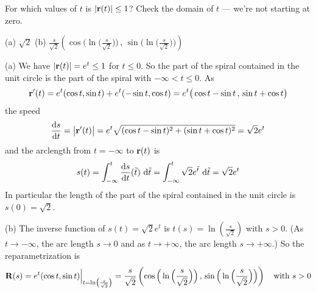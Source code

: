 \begin{hint} 
For which values of $t$ is $|\mathbf{r}(t)|\le 1$? Check the domain of $t$ --- we're not starting at zero.
\end{hint}

\begin{answer} 
(a) $\sqrt{2}$\qquad
(b) $\frac{s}{\sqrt{2}}\left(\cos\Big(\ln\Big(\frac{s}{\sqrt{2}}\Big)\Big)\,,\,
                 \sin\Big(\ln\Big(\frac{s}{\sqrt{2}}\Big)\Big)\right)$
\quad{}
\end{answer}

\begin{solution} (a) We have $|\mathbf{r}(t)|=e^t\le 1$ for $t\le 0$.
So the part of the spiral contained in the unit circle is the part of 
the spiral with $-\infty<t\le 0$.
As
\begin{align*}
\mathbf{r}'(t) = e^t (\cos t, \sin t) + e^t (-\sin t, \cos t)
        =e^t\big(\cos t -\sin t\,,\,\sin t + \cos t\big)
\end{align*}
the speed
\begin{align*}
\diff{s}{t} = \big|\vr'(t)\big|
            = e^t \sqrt{(\cos t-\sin t)^2+(\sin t+\cos t)^2}
            = \sqrt{2}e^t
\end{align*}
and the arclength from $t=-\infty$ to $\mathbf{r}(t)$ is
\begin{equation*}
s(t)=\int_{-\infty}^t \diff{s}{t}(\tilde t)\ \dee{\tilde t}
    =\int_{-\infty}^t \sqrt{2} e^{\tilde t}\ \dee{\tilde t}
    =\sqrt{2}e^t
\end{equation*}
In particular the length of the part of the spiral contained in the
unit circle is $s(0)=\sqrt{2}$.

\noindent (b)
The inverse function of $s(t)=\sqrt{2} e^t$ is
$t(s) =\ln\left(\frac{s}{\sqrt{2}}\right)$ with $s>0$. 
(As $t\rightarrow-\infty$, the arc length $s\rightarrow 0$ and 
as $t\rightarrow+\infty$, the arc length $s\rightarrow +\infty$.)
So the reparametrization is
\begin{align*}
\mathbf{R}(s) = e^t (\cos t, \sin t)\Big|_{t=\ln\left(\frac{s}{\sqrt{2}}\right)}
=\frac{s}{\sqrt{2}}\left(\cos\Big(\ln\Big(\frac{s}{\sqrt{2}}\Big)\Big)\,,\,
                 \sin\Big(\ln\Big(\frac{s}{\sqrt{2}}\Big)\Big)\right)
\quad\text{with $s>0$}
\end{align*}


\end{solution}



